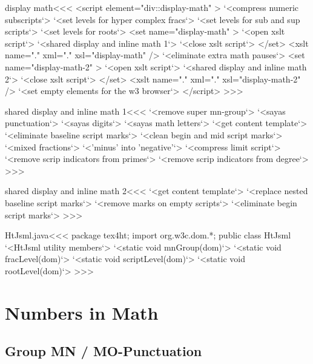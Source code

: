 \documentclass{article}
\begin{document}
\<display math\><<<
<script element="div::display-math" >
  `<compress numeric subscripts`>
  `<set levels for hyper complex fracs`>
  `<set levels for sub and sup scripts`>
  `<set levels for roots`>
  <set name="display-math" >
     `<open xslt script`>
     `<shared display and inline math 1`>
     `<close xslt script`>
  </set>
  <xslt name="." xml="." xsl="display-math" />
  `<eliminate extra math pauses`>
  <set name="display-math-2" >
     `<open xslt script`>
     `<shared display and inline math 2`>
     `<close xslt script`>
  </set>
  <xslt name="." xml="." xsl="display-math-2" />
  `<set empty elements for the w3 browser`>
</script> 
>>>




\<shared display and inline math 1\><<<
`<remove super mn-group`>
`<sayas punctuation`>
`<sayas digits`>
`<sayas math letters`>
`<get content template`>
`<eliminate baseline script marks`> 
`<clean begin and mid script marks`> 
`<mixed fractions`> 
`<'minus' into 'negative'`> 
`<compress limit script`>
`<remove scrip indicators from primes`> 
`<remove scrip indicators from degree`> 
>>>


\<shared display and inline math 2\><<<
`<get content template`>
`<replace nested baseline script marks`>
`<remove marks on empty scripts`>
`<eliminate begin script marks`> 
>>>






\<HtJsml.java\><<<
package tex4ht;
import org.w3c.dom.*;
public class HtJsml {
  `<HtJsml utility members`>
  `<static void mnGroup(dom)`>
  `<static void fracLevel(dom)`>
  `<static void scriptLevel(dom)`>
  `<static void rootLevel(dom)`>
}
>>>




\section{Numbers in Math}


\subsection{Group MN / MO-Punctuation}


 
\end{document}
